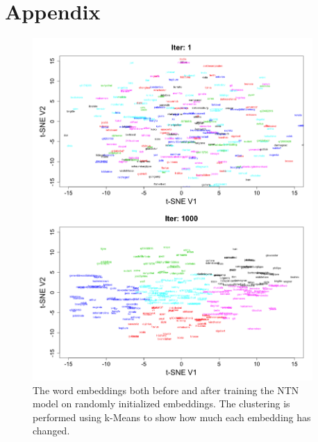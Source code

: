 \documentclass[11.5pt]{article}
\newcounter{graphics}
\begin{document}
\section*{Appendix}
\begin{figure}[h!]
\centerline{\includegraphics[width=0.95\textwidth]{report_ntn/FirstLast-tSNE.png}}
  \caption{\small  The word embeddings both before and after training the NTN model on randomly initialized embeddings. The clustering is performed using k-Means to show how much each embedding has changed. }
\label{tSNE}
\end{figure}
\end{document}
